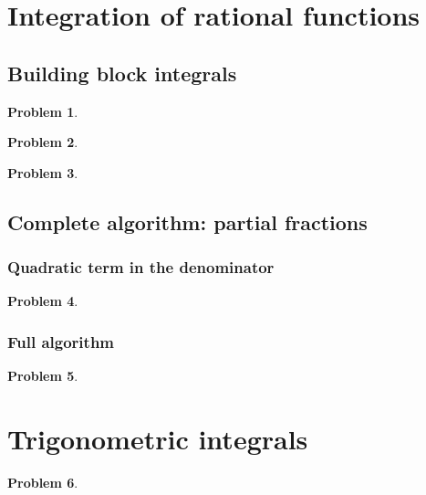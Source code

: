 \documentclass{article}
\newtheorem{problem}{Problem}
\begin{document}
\section{Integration of rational functions}
\subsection{Building block integrals}
\begin{problem}

\end{problem}


\begin{problem}

\end{problem}

\begin{problem}

\end{problem}

\subsection{Complete algorithm: partial fractions}
\subsubsection{Quadratic term in the denominator}
\begin{problem}

\end{problem}
\subsubsection{Full algorithm}
\begin{problem}

\end{problem}


\section{Trigonometric integrals}
\begin{problem}

\end{problem}
\end{document}
